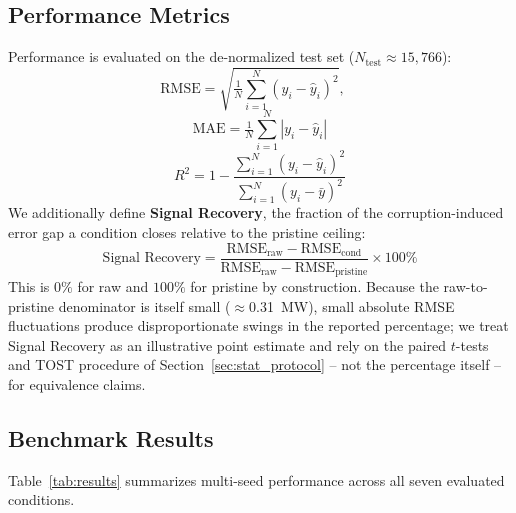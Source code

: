 \documentclass[conference]{IEEEtran}
\begin{document}
\subsection{Performance Metrics}
Performance is evaluated on the de-normalized test set ($N_{\text{test}} \approx 15{,}766$):
\begin{equation}
\text{RMSE} = \sqrt{\tfrac{1}{N}\textstyle\sum_{i=1}^N (y_i - \hat{y}_i)^2}, \quad
\end{equation}
\begin{equation}
\text{MAE} = \tfrac{1}{N}\textstyle\sum_{i=1}^N |y_i - \hat{y}_i|
\end{equation}
\begin{equation}
R^2 = 1 - \frac{\sum_{i=1}^N (y_i - \hat{y}_i)^2}{\sum_{i=1}^N (y_i - \bar{y})^2}
\end{equation}
We additionally define \textbf{Signal Recovery}, the fraction of the corruption-induced error gap a condition closes relative to the pristine ceiling:
\begin{equation}
\text{Signal Recovery} = \frac{\text{RMSE}_{\text{raw}} - \text{RMSE}_{\text{cond}}}{\text{RMSE}_{\text{raw}} - \text{RMSE}_{\text{pristine}}} \times 100\%
\label{eq:sigrecov}
\end{equation}
This is $0\%$ for raw and $100\%$ for pristine by construction. Because the raw-to-pristine denominator is itself small ($\approx$0.31~MW), small absolute RMSE fluctuations produce disproportionate swings in the reported percentage; we treat Signal Recovery as an illustrative point estimate and rely on the paired $t$-tests and TOST procedure of Section~\ref{sec:stat_protocol} -- not the percentage itself -- for equivalence claims.

\subsection{Benchmark Results}
Table~\ref{tab:results} summarizes multi-seed performance across all seven evaluated conditions.
\end{document}
